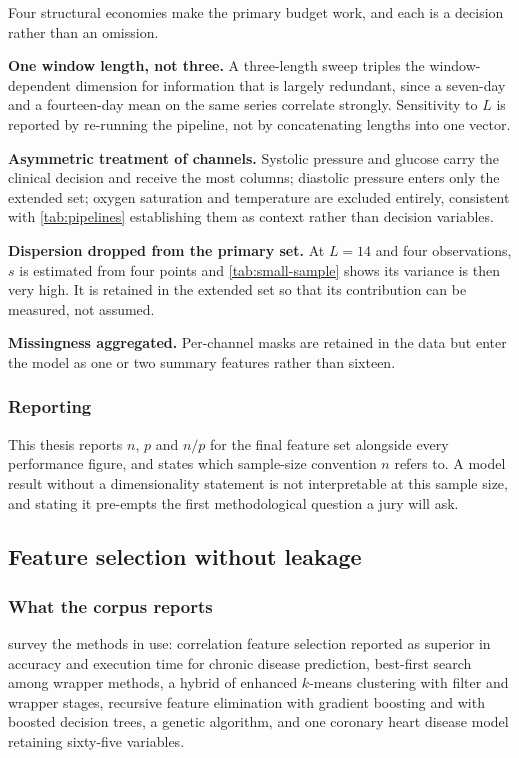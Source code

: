 \documentclass[12pt,a4paper,oneside]{report}
\begin{document}
Four structural economies make the primary budget work, and each is a decision rather than an omission.

\textbf{One window length, not three.} A three-length sweep triples the window-dependent dimension for information that is largely redundant, since a seven-day and a fourteen-day mean on the same series correlate strongly. Sensitivity to $L$ is reported by re-running the pipeline, not by concatenating lengths into one vector.

\textbf{Asymmetric treatment of channels.} Systolic pressure and glucose carry the clinical decision and receive the most columns; diastolic pressure enters only the extended set; oxygen saturation and temperature are excluded entirely, consistent with \cref{tab:pipelines} establishing them as context rather than decision variables.

\textbf{Dispersion dropped from the primary set.} At $L = 14$ and four observations, $s$ is estimated from four points and \cref{tab:small-sample} shows its variance is then very high. It is retained in the extended set so that its contribution can be measured, not assumed.

\textbf{Missingness aggregated.} Per-channel masks are retained in the data but enter the model as one or two summary features rather than sixteen.

\subsubsection{Reporting}

This thesis reports $n$, $p$ and $n/p$ for the final feature set alongside every performance figure, and states which sample-size convention $n$ refers to. A model result without a dimensionality statement is not interpretable at this sample size, and stating it pre-empts the first methodological question a jury will ask.

\subsection{Feature selection without leakage}\label{sec:selection}

\subsubsection{What the corpus reports}

\Textcite{liu2025review} survey the methods in use: correlation feature selection reported as superior in accuracy and execution time for chronic disease prediction, best-first search among wrapper methods, a hybrid of enhanced $k$-means clustering with filter and wrapper stages, recursive feature elimination with gradient boosting and with boosted decision trees, a genetic algorithm, and one coronary heart disease model retaining sixty-five variables.
\end{document}

